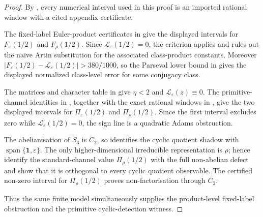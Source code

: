 \documentclass[11pt,a4paper]{amsart}
\theoremstyle{plain}
\theoremstyle{definition}
\theoremstyle{remark}
\begin{document}
\begin{proof}
  By , every numerical interval
  used in this proof is an imported rational window with a cited appendix
  certificate.

  The fixed-label Euler-product certificates in
   give the displayed intervals
  for \(F_\varepsilon(1/2)\) and \(F_\rho(1/2)\).  Since
  \(\mathcal L_\varepsilon(1/2)=0\), the criterion
   applies and rules out the
  naive Artin substitution for the associated class-product constants.
  Moreover
  \(|F_\varepsilon(1/2)-\mathcal L_\varepsilon(1/2)|>380/1000\), so the
  Parseval lower bound in  gives the
  displayed normalized class-level error for some conjugacy class.

  The matrices and character table in
   give \(\eta<2\) and
  \(\mathcal L_\varepsilon(z)\equiv0\).  The primitive-channel identities
  in , together with the exact
  rational windows in , give the
  two displayed intervals for \(\Pi_\varepsilon(1/2)\) and
  \(\Pi_\rho(1/2)\).  Since the first interval excludes zero while
  \(\mathcal L_\varepsilon(1/2)=0\), the sign line is a quadratic Adams
  obstruction.

  The abelianisation of \(S_3\) is \(C_2\), so
   identifies the
  cyclic quotient shadow with
  \(\operatorname{span}\{\mathbf1,\varepsilon\}\).  The only
  higher-dimensional irreducible representation is \(\rho\); hence
   identify
  the standard-channel value \(\Pi_\rho(1/2)\) with the full
  non-abelian defect and show that it is orthogonal to every cyclic
  quotient observable.  The certified non-zero interval for
  \(\Pi_\rho(1/2)\) proves non-factorisation through \(C_2\).

  Thus the same finite model simultaneously supplies the product-level
  fixed-label obstruction and the primitive cyclic-detection witness.
\end{proof}
\end{document}
